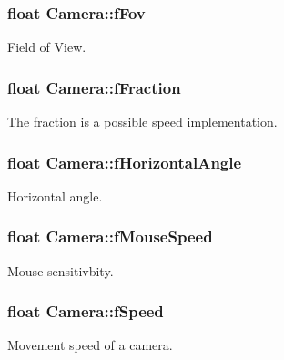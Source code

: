 \subsubsection[{\texorpdfstring{f\+Fov}{fFov}}]{\setlength{\rightskip}{0pt plus 5cm}float Camera\+::f\+Fov\hspace{0.3cm}{\ttfamily [private]}}\hypertarget{class_camera_a8038d7c06da7d521ae843631efb69598}{}\label{class_camera_a8038d7c06da7d521ae843631efb69598}
Field of View. 
\subsubsection[{\texorpdfstring{f\+Fraction}{fFraction}}]{\setlength{\rightskip}{0pt plus 5cm}float Camera\+::f\+Fraction\hspace{0.3cm}{\ttfamily [private]}}\hypertarget{class_camera_a74b69f00fa9be5cfcc62df59fdbb9b8b}{}\label{class_camera_a74b69f00fa9be5cfcc62df59fdbb9b8b}
The fraction is a possible speed implementation. 
\subsubsection[{\texorpdfstring{f\+Horizontal\+Angle}{fHorizontalAngle}}]{\setlength{\rightskip}{0pt plus 5cm}float Camera\+::f\+Horizontal\+Angle\hspace{0.3cm}{\ttfamily [private]}}\hypertarget{class_camera_a3a8aadb8799bae49c8ddbe18ffd18844}{}\label{class_camera_a3a8aadb8799bae49c8ddbe18ffd18844}
Horizontal angle. 
\subsubsection[{\texorpdfstring{f\+Mouse\+Speed}{fMouseSpeed}}]{\setlength{\rightskip}{0pt plus 5cm}float Camera\+::f\+Mouse\+Speed\hspace{0.3cm}{\ttfamily [private]}}\hypertarget{class_camera_a450d3b9ceabac106ea9703e5b5cd3738}{}\label{class_camera_a450d3b9ceabac106ea9703e5b5cd3738}
Mouse sensitivbity. 
\subsubsection[{\texorpdfstring{f\+Speed}{fSpeed}}]{\setlength{\rightskip}{0pt plus 5cm}float Camera\+::f\+Speed\hspace{0.3cm}{\ttfamily [private]}}\hypertarget{class_camera_aeb8498caa945fa6f40756ef523b2ee14}{}\label{class_camera_aeb8498caa945fa6f40756ef523b2ee14}
Movement speed of a camera. 
